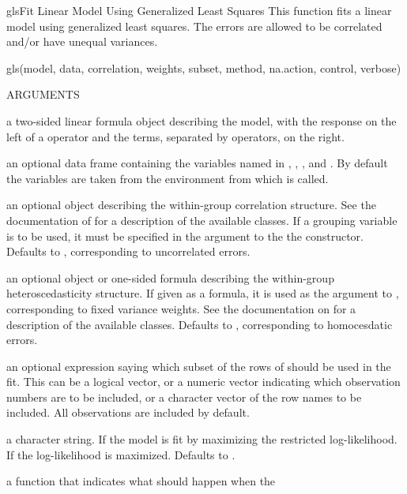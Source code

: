 \documentclass[pdftex]{article} \usepackage{url,graphicx}
\renewcommand{\Twiddle}{\mbox{\(\sim\)}}
\begin{document}
\begin{Helpfile}{gls}{Fit Linear Model Using Generalized Least Squares}
This function fits a linear model using generalized least
squares. The errors are allowed to be correlated and/or have unequal
variances.
\begin{Example}
gls(model, data, correlation, weights, subset, method, na.action, 
    control, verbose)
\end{Example}
\begin{Argument}{ARGUMENTS}
\item[\Co{model:}]
a two-sided linear formula object describing the
model, with the response on the left of a \Co{{\Twiddle}} operator and the
terms, separated by \Co{+} operators, on the right.
\item[\Co{data:}]
an optional data frame containing the variables named in
, , , and
. By default the variables are taken from the
environment from which  is called.
\item[\Co{correlation:}]
an optional  object describing the
within-group correlation structure. See the documentation of
 for a description of the available 
classes. If a grouping variable is to be used, it must be specified
in the  argument to the the 
constructor. Defaults to , corresponding to uncorrelated
errors.
\item[\Co{weights:}]
an optional  object or one-sided formula
describing the within-group heteroscedasticity structure. If given as
a formula, it is used as the argument to ,
corresponding to fixed variance weights. See the documentation on
 for a description of the available 
classes. Defaults to , corresponding to homocesdatic
errors.
\item[\Co{subset:}]
an optional expression saying which subset of the rows of
 should  be  used in the fit. This can be a logical
vector, or a numeric vector indicating which observation numbers are
to be included, or a  character  vector of the row names to be
included.  All observations are included by default.
\item[\Co{method:}]
a character string.  If  the model is fit by
maximizing the restricted log-likelihood.  If  the
log-likelihood is maximized.  Defaults to .
\item[\Co{na.action:}]
a function that indicates what should happen when the

\end{Argument}
\end{Helpfile}
\end{document}

